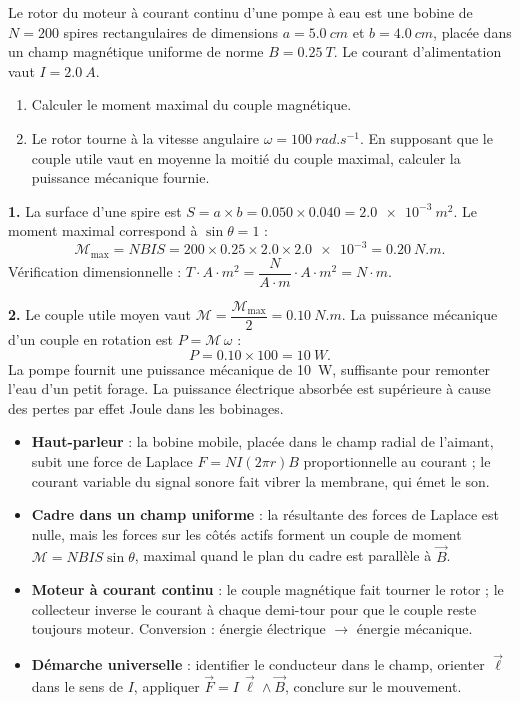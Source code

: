 \documentclass[11pt]{article}
\begin{document}
\begin{exoresolu}
Le rotor du moteur à courant continu d'une pompe à eau est une bobine de $N = 200$ spires rectangulaires de dimensions $a = \SI{5,0}{cm}$ et $b = \SI{4,0}{cm}$, placée dans un champ magnétique uniforme de norme $B = \SI{0,25}{T}$. Le courant d'alimentation vaut $I = \SI{2,0}{A}$.
\begin{enumerate}
\item Calculer le moment maximal du couple magnétique.
\item Le rotor tourne à la vitesse angulaire $\omega = \SI{100}{rad.s^{-1}}$. En supposant que le couple utile vaut en moyenne la moitié du couple maximal, calculer la puissance mécanique fournie.
\end{enumerate}
\tcblower
\textbf{1.} La surface d'une spire est $S = a \times b = \num{0,050} \times \num{0,040} = \SI{2,0e-3}{m^2}$. Le moment maximal correspond à $\sin\theta = 1$ :
\[ \mathcal{M}_{\max} = N B I S = 200 \times \num{0,25} \times \num{2,0} \times \num{2,0e-3} = \SI{0,20}{N.m}. \]
Vérification dimensionnelle : $T \cdot A \cdot m^2 = \dfrac{N}{A \cdot m} \cdot A \cdot m^2 = N \cdot m$. \checkmark

\textbf{2.} Le couple utile moyen vaut $\mathcal{M} = \dfrac{\mathcal{M}_{\max}}{2} = \SI{0,10}{N.m}$. La puissance mécanique d'un couple en rotation est $P = \mathcal{M}\,\omega$ :
\[ P = \num{0,10} \times 100 = \SI{10}{W}. \]
La pompe fournit une puissance mécanique de \SI{10}{W}, suffisante pour remonter l'eau d'un petit forage. La puissance électrique absorbée est supérieure à cause des pertes par effet Joule dans les bobinages.
\end{exoresolu}

\begin{aretenir}
\begin{itemize}
\item \textbf{Haut-parleur} : la bobine mobile, placée dans le champ radial de l'aimant, subit une force de Laplace $F = N I (2\pi r) B$ proportionnelle au courant ; le courant variable du signal sonore fait vibrer la membrane, qui émet le son.
\item \textbf{Cadre dans un champ uniforme} : la résultante des forces de Laplace est nulle, mais les forces sur les côtés actifs forment un couple de moment $\mathcal{M} = N B I S \sin\theta$, maximal quand le plan du cadre est parallèle à $\vec{B}$.
\item \textbf{Moteur à courant continu} : le couple magnétique fait tourner le rotor ; le collecteur inverse le courant à chaque demi-tour pour que le couple reste toujours moteur. Conversion : énergie électrique $\rightarrow$ énergie mécanique.
\item \textbf{Démarche universelle} : identifier le conducteur dans le champ, orienter $\vec{\ell}$ dans le sens de $I$, appliquer $\vec{F} = I\,\vec{\ell} \wedge \vec{B}$, conclure sur le mouvement.
\end{itemize}
\end{aretenir}
\end{document}
